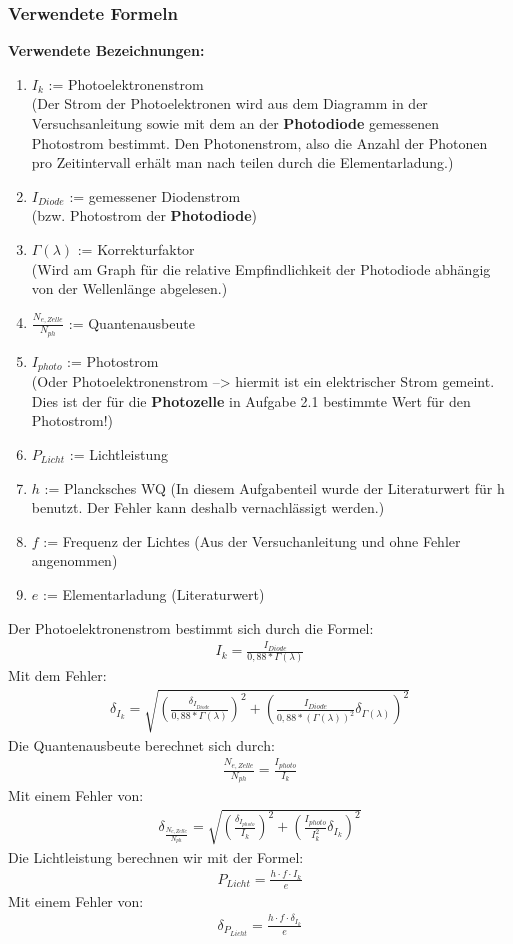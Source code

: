 \documentclass[12px]{scrartcl}
\begin{document}
\subsubsection{Verwendete Formeln}
\textbf{Verwendete Bezeichnungen:}
\begin{enumerate}
\item $I_k$ := Photoelektronenstrom\\
(Der Strom der Photoelektronen wird aus dem Diagramm in der Versuchsanleitung sowie mit dem an der \textbf{Photodiode} gemessenen Photostrom bestimmt. Den Photonenstrom, also die Anzahl der Photonen pro Zeitintervall erhält man nach teilen durch die Elementarladung.)
\item $I_{Diode}$ := gemessener Diodenstrom\\
(bzw. Photostrom der \textbf{Photodiode})
\item $\Gamma(\lambda)$ := Korrekturfaktor\\
(Wird am Graph für die relative Empfindlichkeit der Photodiode abhängig von der Wellenlänge abgelesen.)
\item $\frac{N_{e,Zelle}}{N_{ph}}$ := Quantenausbeute
\item $I_{photo}$ := Photostrom\\
(Oder Photoelektronenstrom --> hiermit ist ein elektrischer Strom gemeint. Dies ist der für die \textbf{Photozelle} in Aufgabe 2.1 bestimmte Wert für den Photostrom!)
\item $P_{Licht}$ := Lichtleistung
\item $h$ := Plancksches WQ
(In diesem Aufgabenteil wurde der Literaturwert für h benutzt. Der Fehler kann deshalb vernachlässigt werden.)
\item $f$ := Frequenz der Lichtes
(Aus der Versuchanleitung und ohne Fehler angenommen)
\item $e$ := Elementarladung
(Literaturwert)
\end{enumerate}
Der Photoelektronenstrom bestimmt sich durch die Formel:
\begin{align}
I_k = \frac{I_{Diode}}{0,88*\Gamma(\lambda)}
\end{align}
Mit dem Fehler:
\begin{align}
\delta_{I_k} = \sqrt{
\left(\frac{\delta_{I_{Diode}}}{0,88*\Gamma(\lambda)}\right)^2+
\left(\frac{I_{Diode}}{0,88*(\Gamma(\lambda))^2}
\delta_{\Gamma(\lambda)}\right)^2}
\end{align}
Die Quantenausbeute berechnet sich durch:
\begin{align}
\frac{N_{e,Zelle}}{N_{ph}} = \frac{I_{photo}}{I_{k}}
\end{align}
Mit einem Fehler von:
\begin{align}
\delta_{\frac{N_{e,Zelle}}{N_{ph}}} = \sqrt{
\left(\frac{\delta_{I_{photo}}}{I_{k}}\right)^2+
\left(\frac{I_{photo}}{I_{k}^2}\delta_{I_{k}}\right)^2}
\end{align}
Die Lichtleistung berechnen wir mit der Formel:
\begin{align}
P_{Licht} = \frac{h\cdot f\cdot I_k}{e}
\end{align}
Mit einem Fehler von:
\begin{align}
\delta_{P_{Licht}} = \frac{h\cdot f\cdot \delta_{I_k}}{e}
\end{align}
\end{document}
